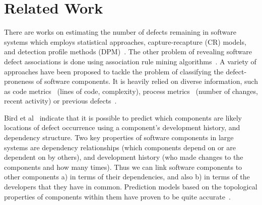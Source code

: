 \documentclass[conference]{IEEEtran}
\begin{document}



\section{Related Work}
\label{review}

There are works on estimating the number of defects remaining in software systems which employs statistical approaches, capture-recapture (CR) models, and detection profile methods (DPM)~\cite{song2011general}. The other problem of revealing software defect associations is done using association rule mining
algorithms~\cite{song2006software}. A variety of approaches have been proposed to tackle the problem of classifying the defect-proneness of software components. It is heavily relied on diverse information, such as code metrics~\cite{d2010extensive,menzies2007data, nagappan2006mining,shepperd2014researcher} (lines of code, complexity), process metrics~\cite{hassan2009predicting} (number of changes, recent activity) or previous defects~\cite{kim2007predicting}.

Bird et al~\cite{bird2009putting} indicate that it is possible to predict which components are likely locations of
defect occurrence using a component's development history,
and dependency structure. Two key properties of software components
in large systems are dependency relationships (which components
depend on or are dependent on by others), and development
history (who made changes to the components and
how many times). Thus we can link software components
to other components a) in terms of their dependencies, and
also b) in terms of the developers that they have in common. Prediction models based on the topological properties
of components within them have proven to be quite
accurate~\cite{zimmermann2008predicting}.
\end{document}
